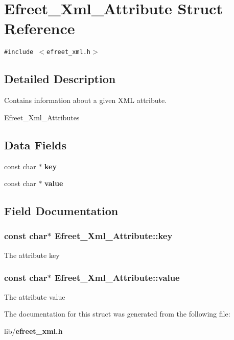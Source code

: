 \section{Efreet\_\-Xml\_\-Attribute Struct Reference}
\label{structEfreet__Xml__Attribute}
{\tt \#include $<$efreet\_\-xml.h$>$}



\subsection{Detailed Description}
Contains information about a given XML attribute. 

Efreet\_\-Xml\_\-Attributes \subsection*{Data Fields}
\begin{CompactItemize}
\item 
const char $\ast$ {\bf key}
\item 
const char $\ast$ {\bf value}
\end{CompactItemize}


\subsection{Field Documentation}
\subsubsection{\setlength{\rightskip}{0pt plus 5cm}const char$\ast$ {\bf Efreet\_\-Xml\_\-Attribute::key}}\label{structEfreet__Xml__Attribute_4c3ff98a22f442e80ede45de49e69aae}


The attribute key 
\subsubsection{\setlength{\rightskip}{0pt plus 5cm}const char$\ast$ {\bf Efreet\_\-Xml\_\-Attribute::value}}\label{structEfreet__Xml__Attribute_9e33fc206400d797c7c98ba17a3bceb3}


The attribute value 

The documentation for this struct was generated from the following file:\begin{CompactItemize}
\item 
lib/{\bf efreet\_\-xml.h}\end{CompactItemize}
